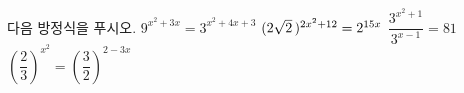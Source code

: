 다음 방정식을 푸시오.
 $9^{x^2+3x}=3^{x^2+4x+3}$
 $(2\sqrt{2}\mkern3mu )^{2x^2+12}=2^{15x}$
 $\dfrac{3^{x^2+1}}{3^{x-1}}=81$
 $\left(\dfrac{2}{3}\right)^{x^2}=\left(\dfrac{3}{2}\right)^{2-3x}$
